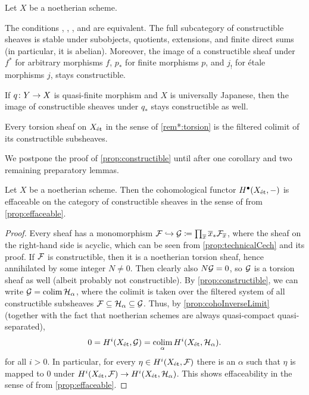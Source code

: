 \begin{prop}\label{prop:constructible}
	Let $X$ be a noetherian scheme.
	\begin{alphanumerate}
		\item The conditions , , , and  are equivalent. The full subcategory of constructible sheaves is stable under subobjects, quotients, extensions, and finite direct sums (in particular, it is abelian). Moreover, the image of a constructible sheaf under $f^*$ for arbitrary morphisms $f$, $p_*$ for finite morphisms $p$, and $j_!$ for étale morphisms $j$, stays constructible.
		\item If $q\colon Y\morphism X$ is quasi-finite morphism and $X$ is universally Japanese, then the image of constructible sheaves under $q_*$ stays constructible as well.
		\item Every torsion sheaf on $X_{\mathrm{\acute{e}t}}$ in the sense of \cref{rem*:torsion} is the filtered colimit of its constructible subsheaves.
	\end{alphanumerate}
\end{prop}
We postpone the proof of \cref{prop:constructible} until after one corollary and two remaining preparatory lemmas.
\begin{cor}
	Let $X$ be a noetherian scheme. Then the cohomological functor $H^\bullet(X_{\mathrm{\acute{e}t}},-)$ is effaceable on the category of constructible sheaves in the sense of  from \cref{prop:effaceable}.
\end{cor}
\begin{proof}
	Every sheaf has a monomorphism $\Ff\monomorphism \Gg\coloneqq \prod_{\ov{x}}\ov{x}_*\Ff_{\ov{x}}$, where the sheaf on the right-hand side is acyclic, which can be seen from \cref{prop:technicalCech} and its proof. If $\mathcal{F}$ is constructible, then it is a noetherian torsion sheaf, hence annihilated by some integer $N\neq 0$. Then clearly also $N\mathcal{G}=0$, so $\mathcal{G}$ is a torsion sheaf as well (albeit probably not constructible). By \cref{prop:constructible}, we can write $\mathcal{G}=\operatorname*{colim} \mathcal{H}_\alpha$, where the colimit is taken over the filtered system of all constructible subsheaves $\mathcal{F}\subseteq \mathcal{H}_\alpha\subseteq \mathcal{G}$. Thus, by \cref{prop:cohoInverseLimit} (together with the fact that noetherian schemes are always quasi-compact quasi-separated),
	\begin{equation*}
		0=H^i(X_{\mathrm{\acute{e}t}},\mathcal{G})=\operatorname*{colim}_\alpha H^i(X_{\mathrm{\acute{e}t}},\mathcal{H}_\alpha).
	\end{equation*}
	for all $i>0$. In particular, for every $\eta\in H^i(X_{\mathrm{\acute{e}t}},\mathcal{F})$ there is an $\alpha$ such that $\eta$ is mapped to $0$ under $H^i(X_\et,\Ff)\morphism H^i(X_\et,\Hh_\alpha)$. This shows effaceability in the sense of  from \cref{prop:effaceable}.
\end{proof}

